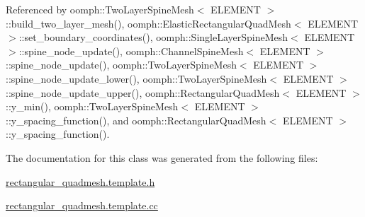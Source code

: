 Referenced by oomph\+::\+Two\+Layer\+Spine\+Mesh$<$ E\+L\+E\+M\+E\+N\+T $>$\+::build\+\_\+two\+\_\+layer\+\_\+mesh(), oomph\+::\+Elastic\+Rectangular\+Quad\+Mesh$<$ E\+L\+E\+M\+E\+N\+T $>$\+::set\+\_\+boundary\+\_\+coordinates(), oomph\+::\+Single\+Layer\+Spine\+Mesh$<$ E\+L\+E\+M\+E\+N\+T $>$\+::spine\+\_\+node\+\_\+update(), oomph\+::\+Channel\+Spine\+Mesh$<$ E\+L\+E\+M\+E\+N\+T $>$\+::spine\+\_\+node\+\_\+update(), oomph\+::\+Two\+Layer\+Spine\+Mesh$<$ E\+L\+E\+M\+E\+N\+T $>$\+::spine\+\_\+node\+\_\+update\+\_\+lower(), oomph\+::\+Two\+Layer\+Spine\+Mesh$<$ E\+L\+E\+M\+E\+N\+T $>$\+::spine\+\_\+node\+\_\+update\+\_\+upper(), oomph\+::\+Rectangular\+Quad\+Mesh$<$ E\+L\+E\+M\+E\+N\+T $>$\+::y\+\_\+min(), oomph\+::\+Two\+Layer\+Spine\+Mesh$<$ E\+L\+E\+M\+E\+N\+T $>$\+::y\+\_\+spacing\+\_\+function(), and oomph\+::\+Rectangular\+Quad\+Mesh$<$ E\+L\+E\+M\+E\+N\+T $>$\+::y\+\_\+spacing\+\_\+function().



The documentation for this class was generated from the following files\+:\begin{DoxyCompactItemize}
\item 
\hyperlink{rectangular__quadmesh_8template_8h}{rectangular\+\_\+quadmesh.\+template.\+h}\item 
\hyperlink{rectangular__quadmesh_8template_8cc}{rectangular\+\_\+quadmesh.\+template.\+cc}\end{DoxyCompactItemize}
